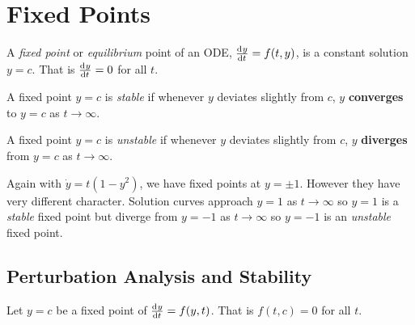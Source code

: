 \documentclass[../main.tex]{subfiles}
\begin{document}
\section{Fixed Points}
\begin{definition}
  A \textit{fixed point} or \textit{equilibrium} point of an ODE, $\deriv{y}{t} = f(t, y)$, is a constant solution $y = c$.
  That is $\deriv{y}{t} = 0$ for all $t$.
\end{definition}
\begin{definition}
  A fixed point $y = c$ is \textit{stable} if whenever $y$ deviates slightly from $c$, $y$ \textbf{converges} to $y = c$ as $t \to \infty$.
\end{definition}
\begin{definition}
  A fixed point $y = c$ is \textit{unstable} if whenever $y$ deviates slightly from $c$, $y$ \textbf{diverges} from $y = c$ as $t \to \infty$.
\end{definition}
\begin{example}
  Again with $\dot{y} = t(1-y^2)$, we have fixed points at $y = \pm 1$.
  However they have very different character.
  Solution curves approach $y = 1$ as $t \to \infty$ so $y = 1$ is a \textit{stable} fixed point but diverge from $y = -1$ as $t \to \infty$ so $y = - 1$ is an \textit{unstable} fixed point.
\end{example}
\subsection{Perturbation Analysis and Stability}
Let $y = c$ be a fixed point of $\deriv{y}{t} = f(y, t)$.
That is $f(t, c) = 0$ for all $t$.
\end{document}

